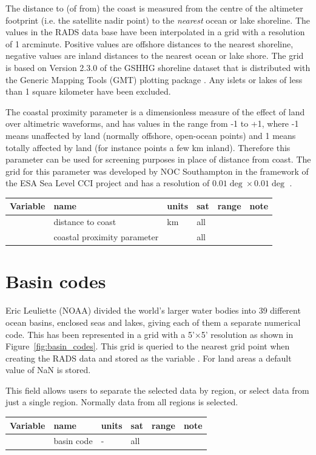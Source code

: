 \documentclass[a4paper,11pt,openany,natbib,nomargin]{thesis}
\newenvironment{vartable}{
\begin{table}[ht]
\small
\begin{tabular}{lllllr}
\hline\hline
Variable & name & units & sat & range & note \\
\hline\hline
}{
\hline
\end{tabular}
\end{table}
}
\begin{document}
The distance to (of from) the coast is measured from the centre of the altimeter footprint (i.e. the satellite nadir point) to the \emph{nearest} ocean or lake shoreline. The values in the RADS data base have been interpolated in a grid with a resolution of 1 arc\-minute. Positive values are offshore distances to the nearest shoreline, negative values are inland distances to the nearest ocean or lake shore. The grid is based on Version 2.3.0 of the GSHHG shoreline dataset \citep{wessel1996} that is distributed with the Generic Mapping Tools (GMT) plotting package \citep{wessel2013}. Any islets or lakes of less than 1 square kilometer have been excluded.

The coastal proximity parameter is a dimensionless measure of the effect of land over altimetric waveforms, and has values in the range from -1 to +1, where -1 means unaffected by land (normally offshore, open-ocean points) and 1 means totally affected by land (for instance points a few km inland). Therefore this parameter can be used for screening purposes in place of distance from coast. The grid for this parameter was developed by NOC Southampton in the framework of the ESA Sea Level CCI project and has a resolution of $0.01\deg\times0.01\deg$ \citep{cipollini2011}.

\begin{vartable}
\var{dist_coast} & distance to coast & km & all && \\
\var{prox_coast} & coastal proximity parameter && all && \\
\end{vartable}

\section{Basin codes}
Eric Leuliette (NOAA) divided the world's larger water bodies into 39 different ocean basins, enclosed seas and lakes, giving each of them a separate numerical code. This has been represented in a grid with a 5'$\times$5' resolution as shown in Figure~\ref{fig:basin_codes}. This grid is queried to the nearest grid point when creating the RADS data and stored as the variable . For land areas a default value of NaN is stored.

This field allows users to separate the selected data by region, or select data from just a single region. Normally data from all regions is selected.

\begin{vartable}
\var{basin} & basin code & - & all && \\
\end{vartable}
\end{document}
